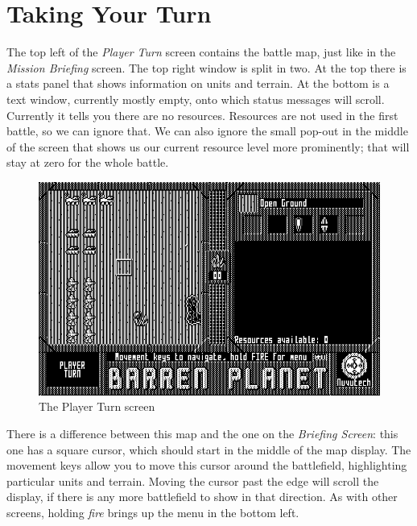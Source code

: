%
%
%
%

\chapter {Taking Your Turn}

\noindent
The top left of the {\it Player Turn} screen contains the battle map, just like in the {\it Mission Briefing} screen. The top right window is split in two. At the top there is a stats panel that shows information on units and terrain. At the bottom is a text window, currently mostly empty, onto which status messages will scroll. Currently it tells you there are no resources. Resources are not used in the first battle, so we can ignore that. We can also ignore the small pop-out in the middle of the screen that shows us our current resource level more prominently; that will stay at zero for the whole battle.

\begin{figure}[h]
  \includegraphics[width=\textwidth]{player-turn}
  \caption{The Player Turn screen}
\end{figure}

There is a difference between this map and the one on the {\it Briefing Screen}: this one has a square cursor, which should start in the middle of the map display. The movement keys allow you to move this cursor around the battlefield, highlighting particular units and terrain. Moving the cursor past the edge will scroll the display, if there is any more battlefield to show in that direction. As with other screens, holding {\it fire} brings up the menu in the bottom left.

